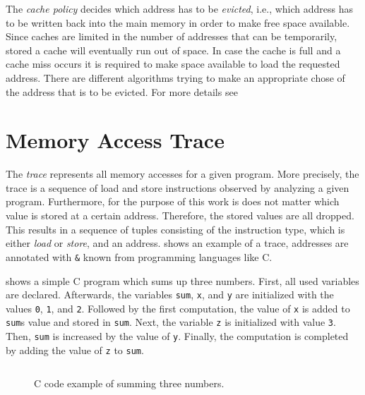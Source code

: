 \documentclass[onecolumn, openright, master, english, signatures]{dbrgrptt}
\begin{document}
The \emph{cache policy} decides which address has to be \emph{evicted}, i.e., which address has to be written back into the main memory in order to make free space available. Since caches are limited in the number of addresses that can be temporarily, stored a cache will eventually run out of space. In case the cache is full and a cache miss occurs it is required to make space available to load the requested address. There are different algorithms trying to make an appropriate chose of the address that is to be evicted. For more details see 


\section{Memory Access Trace}\label{sec:memory-access-trace}

The \emph{\ac{trace}} represents all memory accesses for a given program. More precisely, the \ac{trace} is a sequence of load and store instructions observed by analyzing a given program. Furthermore, for the purpose of this work is does not matter which value is stored at a certain address. Therefore, the stored values are all dropped. This results in a sequence of tuples consisting of the instruction type, which is either \emph{load} or \emph{store}, and an address.  shows an example of a \ac{trace}, addresses are annotated with \texttt{\&} known from programming languages like C.

 shows a simple C program which sums up three numbers. First, all used variables are declared. Afterwards, the variables \texttt{sum}, \texttt{x}, and \texttt{y} are initialized with the values \texttt{0}, \texttt{1}, and \texttt{2}. Followed by the first computation, the value of \texttt{x} is added to \texttt{sum}s value and stored in \texttt{sum}. Next, the variable \texttt{z} is initialized with value \texttt{3}. Then, \texttt{sum} is increased by the value of \texttt{y}. Finally, the computation is completed by adding the value of \texttt{z} to \texttt{sum}.

\begin{figure}[!ht]
  \centering
  \begin{tabular}{c}
  
  \end{tabular}
  \caption{C code example of summing three numbers.}
  \label{fig:mat-example-c-code}
\end{figure}
\end{document}
